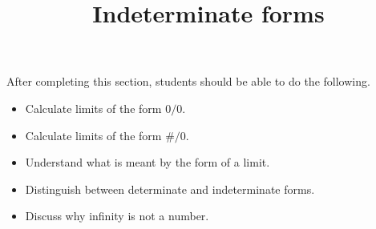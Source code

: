 \documentclass{ximera}
\title{Indeterminate forms}
\begin{document}
\begin{abstract}
\end{abstract}

\maketitle

After completing this section, students should be able to do the following.

\begin{itemize}
	\item Calculate limits of the form $0/0$.
	\item Calculate limits of the form $\#/0$.
	\item Understand what is meant by the form of a limit.
	\item Distinguish between determinate and indeterminate forms.
	\item Discuss why infinity is not a number.
\end{itemize}
\end{document}
